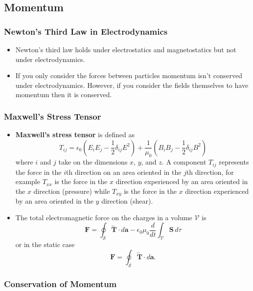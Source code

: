 \documentclass{article}
\renewcommand{\vec}[1]{\boldsymbol{\mathbf{#1}}}
\newcommand{\tensor}[1]{\overleftrightarrow{\boldsymbol{\mathbf{#1}}}}
\begin{document}
\subsection{Momentum}

\subsubsection{Newton's Third Law in Electrodynamics}

\begin{itemize}
  \item Newton's third law holds under electrostatics and magnetostatics but not under electrodynamics.

  \item If you only consider the forces between particles momentum isn't conserved under electrodynamics. However, if you consider the fields themselves to have momentum then it is conserved.
\end{itemize}

\subsubsection{Maxwell's Stress Tensor}

\begin{itemize}
  \item \textbf{Maxwell's stress tensor} is defined as \[T_{i j} = \epsilon_0 \left( E_i E_j - \frac{1}{2} \delta_{i j} E^2 \right) + \frac{1}{\mu_0} \left( B_i B_j - \frac{1}{2} \delta_{i j} B^2 \right)\] where $i$ and $j$ take on the dimensions $x$, $y$, and $z$. A component $T_{i j}$ represents the force in the $i$th direction on an area oriented in the $j$th direction, for example $T_{x x}$ is the force in the $x$ direction experienced by an area oriented in the $x$ direction (pressure) while $T_{x y}$ is the force in the $x$ direction experienced by an area oriented in the $y$ direction (shear).

  \item The total electromagnetic force on the charges in a volume $\mathcal{V}$ is \[\vec{F} = \oint_\mathcal{S} \tensor{T} \cdot d \vec{a} - \epsilon_0 \mu_0 \frac{d}{d t} \int_\mathcal{V} \vec{S} \,d \tau\] or in the static case \[\vec{F} = \oint_\mathcal{S} \tensor{T} \cdot d \vec{a}.\]
\end{itemize}

\subsubsection{Conservation of Momentum}
\end{document}
